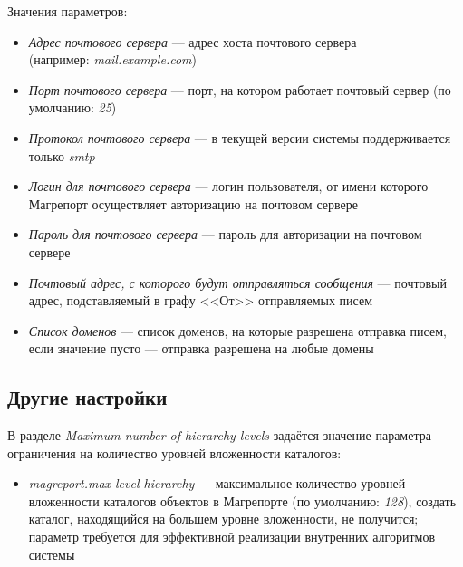 \documentclass[../user-manual.tex]{subfiles}
\begin{document}
	Значения параметров:
	\begin{itemize}
		\item \textit{Адрес почтового сервера} --- адрес хоста почтового сервера \\ (например: \textit{mail.example.com})
		
		\item \textit{Порт почтового сервера} --- порт, на котором работает почтовый сервер (по умолчанию: \textit{25})
		
		\item \textit{Протокол почтового сервера} --- в текущей версии системы поддерживается только \textit{smtp}
		
		\item \textit{Логин для почтового сервера} --- логин пользователя, от имени которого Магрепорт осуществляет авторизацию на почтовом сервере
		
		\item \textit{Пароль для почтового сервера} --- пароль для авторизации на почтовом сервере
		
		\item \textit{Почтовый адрес, с которого будут отправляться сообщения} --- почтовый адрес, подставляемый в графу <<От>> отправляемых писем
		
		\item \textit{Список доменов} --- список доменов, на которые разрешена отправка писем, если значение пусто --- отправка разрешена на любые домены
		
	\end{itemize}
	
	\subsection{Другие настройки} \label{subsection:other-settings}
	
	В разделе \textit{Maximum number of hierarchy levels} задаётся значение параметра ограничения на количество уровней вложенности каталогов:
	
	\begin{itemize}
		\item \textit{magreport.max-level-hierarchy} --- максимальное количество уровней вложенности каталогов объектов в Магрепорте (по умолчанию: \textit{128}), создать каталог, находящийся на большем уровне вложенности, не получится; параметр требуется для эффективной реализации внутренних алгоритмов системы
	\end{itemize}
\end{document}
